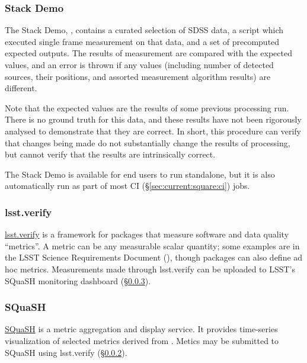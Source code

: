 \documentclass[DM,authoryear,toc,lsstdraft]{lsstdoc}
\begin{document}
\subsubsection{Stack Demo}
\label{sec:current:square:demo}

The Stack Demo, , contains a curated
selection of SDSS data, a script which executed single frame measurement on
that data, and a set of precomputed expected outputs. The results of
measurement are compared with the expected values, and an error is thrown if
any values (including number of detected sources, their positions, and
assorted measurement algorithm results) are different.

Note that the expected values are the results of some previous processing run.
There is no ground truth for this data, and these results have not been
rigorously analysed to demonstrate that they are correct. In short, this
procedure can verify that changes being made do not substantially change the
results of processing, but cannot verify that the results are intrinsically
correct.

The Stack Demo is available for end users to run standalone, but it is also
automatically run as part of most CI (\S\ref{sec:current:square:ci}) jobs.

\subsubsection{lsst.verify}
\label{sec:current:square:verify}


\href{https://github.com/lsst/verify}{lsst.verify} is a framework for packages
that measure software and data quality ``metrics''. A metric can be any
measurable scalar quantity; some examples are in the LSST Science Requirements
Document (), though packages can also define ad hoc metrics.
Measurements made through lsst.verify can be uploaded to LSST's SQuaSH
monitoring dashboard (\S\ref{sec:current:square:squash}).

\subsubsection{SQuaSH}
\label{sec:current:square:squash}

\href{https://squash.lsst.codes}{SQuaSH} is a metric aggregation and display
service. It provides time-series visualization of selected metrics derived
from . Metics may be submitted to SQuaSH using lsst.verify
(\S\ref{sec:current:square:verify}).
\end{document}
